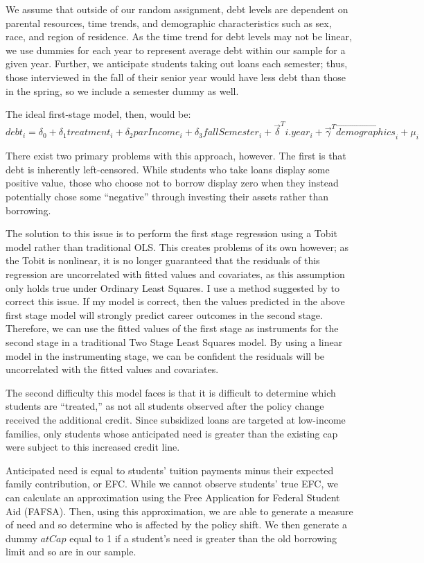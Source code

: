 \documentclass{article}
\begin{document}
	We assume that outside of our random assignment, debt levels are dependent on parental resources, time trends, and demographic characteristics such as sex, race, and region of residence. As the time trend for debt levels may not be linear, we use dummies for each year to represent average debt within our sample for a given year. Further, we anticipate students taking out loans each semester; thus, those interviewed in the fall of their senior year would have less debt than those in the spring, so we include a semester dummy as well.
	
	The ideal first-stage model, then, would be: $$debt_i = \delta_0 + \delta_1 treatment_i + \delta_2 parIncome_i + \delta_3 fallSemester_i + \vec{\delta}^T i.year_i + \vec{\gamma}^T \vec{demographics}_i + \mu_i$$
	
	There exist two primary problems with this approach, however. The first is that debt is inherently left-censored. While students who take loans display some positive value, those who choose not to borrow display zero when they instead potentially chose some ``negative'' through investing their assets rather than borrowing. 
	
	The solution to this issue is to perform the first stage regression using a Tobit model rather than traditional OLS. This creates problems of its own however; as the Tobit is nonlinear, it is no longer guaranteed that the residuals of this regression are uncorrelated with fitted values and covariates, as this assumption only holds true under Ordinary Least Squares. I use a method suggested by \textcite{angrist2009} to correct this issue. If my model is correct, then the values predicted in the above first stage model will strongly predict career outcomes in the second stage. Therefore, we can use the fitted values of the first stage as instruments for the second stage in a traditional Two Stage Least Squares model. By using a linear model in the instrumenting stage, we can be confident the residuals will be uncorrelated with the fitted values and covariates. 
	
	The second difficulty this model faces is that it is difficult to determine which students are ``treated,'' as not all students observed after the policy change received the additional credit. Since subsidized loans are targeted at low-income families, only students whose anticipated need is greater than the existing cap were subject to this increased credit line. 
	
	Anticipated need is equal to students' tuition payments minus their expected family contribution, or EFC. While we cannot observe students' true EFC, we can calculate an approximation using the Free Application for Federal Student Aid (FAFSA). Then, using this approximation, we are able to generate a measure of need and so determine who is affected by the policy shift. We then generate a dummy $atCap$ equal to 1 if a student's need is greater than the old borrowing limit and so are in our sample. 
	
\end{document}
